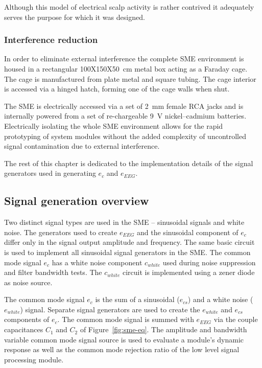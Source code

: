 Although this model of electrical scalp activity is rather contrived
it adequately serves the purpose for which it was designed.

\subsubsection{Interference reduction}
In order to eliminate external interference the complete SME
environment is housed in a rectangular 100X150X50~cm metal box acting
as a Faraday cage. The cage is manufactured from plate metal and
square tubing. The cage interior is accessed via a hinged hatch,
forming one of the cage walls when shut.

The SME is electrically accessed via a set of 2~mm female RCA jacks
and is internally powered from a set of re-chargeable 9~V
nickel--cadmium batteries. Electrically isolating the whole SME
environment allows for the rapid prototyping of system modules without
the added complexity of uncontrolled signal contamination due to
external interference.

The rest of this chapter is dedicated to the implementation details of
the signal generators used in generating $e_c$ and $e_{EEG}$.


\subsection{Signal generation overview}
\label{section:sin}
Two distinct signal types are used in the SME -- sinusoidal signals
and white noise. The generators used to create $e_{EEG}$ and the
sinusoidal component of $e_c$ differ only in the signal output
amplitude and frequency. The same basic circuit is used to implement
all sinusoidal signal generators in the SME. The common mode signal
$e_c$ has a white noise component $c_{white}$ used during noise
suppression and filter bandwidth tests. The $c_{white}$ circuit is
implemented using a zener diode as noise source.


The common mode signal $e_c$ is the sum of a sinusoidal ($e_{cs}$) and
a white noise ($e_{white}$) signal. Separate signal generators are
used to create the $e_{white}$ and $e_{cs}$ components of $e_c$. The
common mode signal is summed with $e_{EEG}$ via the couple
capacitances $C_1$ and $C_2$ of Figure~\ref{fig:sme-eq}. The
amplitude and bandwidth variable common mode signal source is used to
evaluate a module's dynamic response as well as the common mode
rejection ratio of the low level signal processing module.



